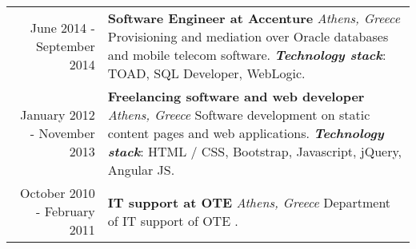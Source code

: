 \documentclass{article}
\begin{document}
\begin{longtable}{r  p{12cm}}
		\small June 2014 - September 2014 & \textbf{\large Software Engineer at Accenture} \textit{\footnotesize Athens, Greece} \newline
		Provisioning and mediation over Oracle databases and mobile telecom software.\newline
		\textit{\textbf{Technology stack}}: TOAD, SQL Developer, WebLogic. \\ [1ex]
		
		\small January 2012 - November 2013 & \textbf{\large Freelancing software and web developer} \textit{\footnotesize Athens, Greece} \newline
		Software development on static content pages and web applications.\newline
		\textit{\textbf{Technology stack}}: HTML / CSS, Bootstrap, Javascript, jQuery, Angular JS. \\ [1ex]
		
		\small October 2010 - February 2011 & \textbf{\large IT support at OTE} \textit{\footnotesize Athens, Greece} \newline
		Department of IT support of OTE . \\ 
	\end{longtable}
	
\end{document}
